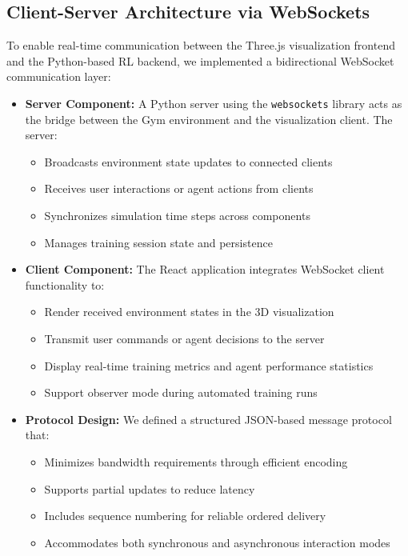 \documentclass[conference]{IEEEtran}
\begin{document}
\subsection{Client-Server Architecture via WebSockets}

To enable real-time communication between the Three.js visualization frontend and the Python-based RL backend, we implemented a bidirectional WebSocket communication layer:

\begin{itemize}
    \item \textbf{Server Component:} A Python server using the \texttt{websockets} library acts as the bridge between the Gym environment and the visualization client. The server:
    \begin{itemize}
        \item Broadcasts environment state updates to connected clients
        \item Receives user interactions or agent actions from clients
        \item Synchronizes simulation time steps across components
        \item Manages training session state and persistence
    \end{itemize}
    
    \item \textbf{Client Component:} The React application integrates WebSocket client functionality to:
    \begin{itemize}
        \item Render received environment states in the 3D visualization
        \item Transmit user commands or agent decisions to the server
        \item Display real-time training metrics and agent performance statistics
        \item Support observer mode during automated training runs
    \end{itemize}
    
    \item \textbf{Protocol Design:} We defined a structured JSON-based message protocol that:
    \begin{itemize}
        \item Minimizes bandwidth requirements through efficient encoding
        \item Supports partial updates to reduce latency
        \item Includes sequence numbering for reliable ordered delivery
        \item Accommodates both synchronous and asynchronous interaction modes
    \end{itemize}
\end{itemize}
\end{document}
